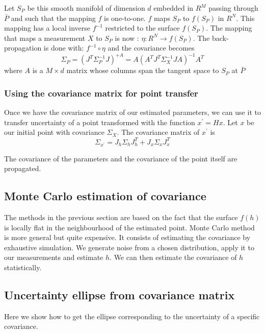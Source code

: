 Let $S_P$ be this smooth manifold of dimension $d$ embedded in $R^M$ passing through $\bar{P}$ and such that the mapping $f$ is one-to-one. $f$ maps $S_P$ to $f(S_P)$ in $R^N$. This mapping has a local inverse $f^{-1}$ restricted to the surface $f(S_P)$.
The mapping that maps a measurement $X$ to $S_P$ is now : $\eta: R^N \rightarrow f(S_P)$. The back-propagation is done with: $f^{-1} \circ \eta$ and the covariance becomes
\begin{equation}
    \Sigma_P = (J^T\Sigma_P^{-1}J)^{+A} = A(A^T J^T \Sigma_X^{-1} JA)^{-1}A^T
\end{equation}
where $A$ is a $M\times d$ matrix whose columns span the tangent space to $S_P$ at $\bar{P}$

\subsubsection{Using the covariance matrix for point transfer}
Once we have the covariance matrix of our estimated parameters, we can use it to transfer uncertainty of a point transformed with the function $x^\prime = Hx$.
Let $x$ be our initial point with covariance $\Sigma_X$. 
The covariance matrix of $x^\prime$ is
\begin{equation}
    \Sigma_{x^\prime} = J_h\Sigma_hJ_h^T + J_x\Sigma_xJ_x^T
\end{equation}

The covariance of the parameters and the covariance of the point itself are propagated.

\subsection{Monte Carlo estimation of covariance}
The methods in the previous section are based on the fact that the surface $f(h)$ is locally flat in the neighbourhood of the estimated point.
Monte Carlo method is more general but quite expensive. It consists of estimating the covariance by exhaustive simulation. We generate noise from a chosen distribution, apply it to our measurements and estimate $h$. We can then estimate the covariance of $h$ statistically.


\subsection{Uncertainty ellipse from covariance matrix}

Here we show how to get the ellipse corresponding to the uncertainty of a specific covariance.

